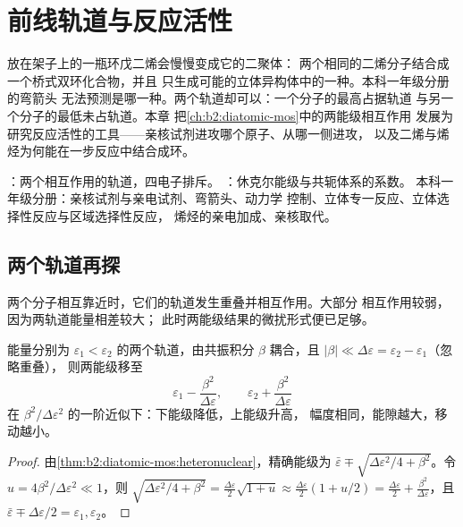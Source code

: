 \chapter{前线轨道与反应活性}\label{ch:b2:frontier-orbitals}

放在架子上的一瓶环戊二烯会慢慢变成它的二聚体：
两个相同的二烯分子结合成一个桥式双环化合物，并且
只生成可能的立体异构体中的一种。本科一年级分册的弯箭头
无法预测是哪一种。两个轨道却可以：一个分子的最高占据轨道
与另一个分子的最低未占轨道。本章
把\cref{ch:b2:diatomic-mos}中的两能级相互作用
发展为研究反应活性的工具——亲核试剂进攻哪个原子、从哪一侧进攻，
以及二烯与烯烃为何能在一步反应中结合成环。

\begin{recall}
：两个相互作用的轨道，四电子排斥。
：休克尔能级与共轭体系的系数。
本科一年级分册：亲核试剂与亲电试剂、弯箭头、动力学
控制、立体专一反应、立体选择性反应与区域选择性反应，
烯烃的亲电加成、亲核取代。
\end{recall}

\section{两个轨道再探}

两个分子相互靠近时，它们的轨道发生重叠并相互作用。大部分
相互作用较弱，因为两轨道能量相差较大；
此时两能级结果的微扰形式便已足够。

\begin{theorem}[两能级的弱相互作用]\label{thm:b2:frontier-orbitals:perturbation}
能量分别为 $\varepsilon_1 < \varepsilon_2$ 的两个轨道，由共振积分
$\beta$ 耦合，且 $|\beta| \ll \Delta\varepsilon = \varepsilon_2 - \varepsilon_1$（忽略重叠），
则两能级移至
\[
  \varepsilon_1 - \frac{\beta^2}{\Delta\varepsilon}, \qquad \varepsilon_2 + \frac{\beta^2}{\Delta\varepsilon}
\]
在 $\beta^2/\Delta\varepsilon^2$ 的一阶近似下：下能级降低，上能级升高，
幅度相同，能隙越大，移动越小。
\end{theorem}

\begin{proof}
由\cref{thm:b2:diatomic-mos:heteronuclear}，精确能级为 $\bar\varepsilon \mp
\sqrt{\Delta\varepsilon^2/4 + \beta^2}$。令 $u = 4\beta^2/\Delta\varepsilon^2 \ll 1$，则 $\sqrt{\Delta\varepsilon^2/4
+ \beta^2} = \frac{\Delta\varepsilon}{2}\sqrt{1 + u} \approx \frac{\Delta\varepsilon}{2}(1 + u/2) =
\frac{\Delta\varepsilon}{2} + \frac{\beta^2}{\Delta\varepsilon}$，且 $\bar\varepsilon \mp \Delta\varepsilon/2 = \varepsilon_1,
\varepsilon_2$。
\end{proof}

